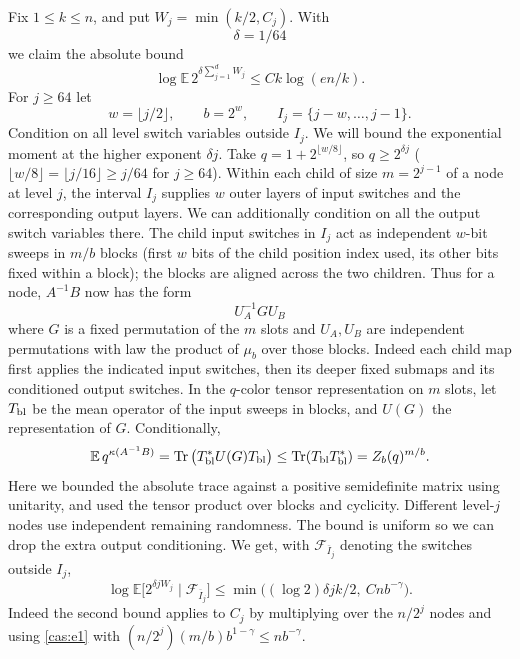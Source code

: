 Fix \(1\le k\le n\), and put \(W_j=\min(k/2,C_j)\). With
\[
\delta=1/64
\]
we claim the absolute bound
\begin{equation}
\log\mathbb E\,2^{\delta\sum_{j=1}^d W_j}
 \le C k\log(e n/k).
\label{cas:e4}
\end{equation}
For \(j\ge 64\) let
\[
w=\lfloor j/2\rfloor,\qquad b=2^w,\qquad I_j=\{j-w,\ldots,j-1\}.
\]
Condition on all level switch variables outside \(I_j\). We will bound the exponential moment at the higher exponent \(\delta j\). Take \(q=1+2^{\lfloor w/8\rfloor}\), so \(q\ge 2^{\delta j}\) (\(\lfloor w/8\rfloor=\lfloor j/16\rfloor\ge j/64\) for \(j\ge64\)). Within each child of size \(m=2^{j-1}\) of a node at level \(j\), the interval \(I_j\) supplies \(w\) outer layers of input switches and the corresponding output layers. We can additionally condition on all the output switch variables there. The child input switches in \(I_j\) act as independent \(w\)-bit sweeps in \(m/b\) blocks (first \(w\) bits of the child position index used, its other bits fixed within a block); the blocks are aligned across the two children. Thus for a node, \(A^{-1}B\) now has the form
\[
U_A^{-1} G U_B
\]
where \(G\) is a fixed permutation of the \(m\) slots and \(U_A,U_B\) are independent permutations with law the product of \(\mu_b\) over those blocks. Indeed each child map first applies the indicated input switches, then its deeper fixed submaps and its conditioned output switches. In the \(q\)-color tensor representation on \(m\) slots, let \(T_{\rm bl}\) be the mean operator of the input sweeps in blocks, and \(U(G)\) the representation of \(G\). Conditionally,
\[
\mathbb E\,q^{\kappa(A^{-1}B)}
=\operatorname{Tr}\big(T_{\rm bl}^* U(G) T_{\rm bl}\big)
\le \operatorname{Tr}(T_{\rm bl}T_{\rm bl}^*)=Z_b(q)^{m/b}.
\]
Here we bounded the absolute trace against a positive semidefinite matrix using unitarity, and used the tensor product over blocks and cyclicity. Different level-\(j\) nodes use independent remaining randomness. The bound is uniform so we can drop the extra output conditioning. We get, with \(\mathcal F_{\overline I_j}\) denoting the switches outside \(I_j\),
\begin{equation}
\log\mathbb E\big[2^{\delta j W_j}\mid\mathcal F_{\overline I_j}\big]
\le \min\big( (\log 2)\delta j k/2,\ C n b^{-\gamma}\big).
\label{cas:e5}
\end{equation}
Indeed the second bound applies to \(C_j\) by multiplying over the \(n/2^j\) nodes and using \eqref{cas:e1} with \((n/2^j)(m/b)b^{1-\gamma}\le n b^{-\gamma}\).


